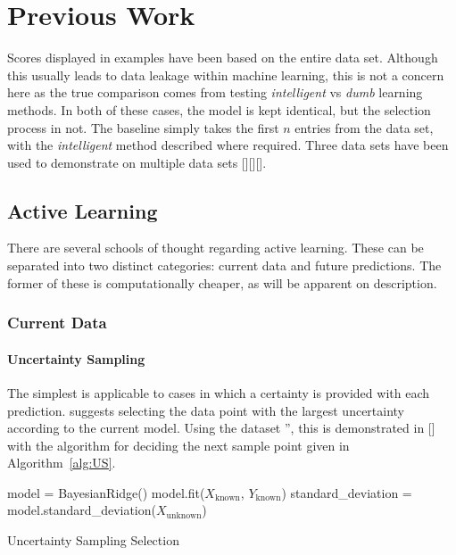 
\chapter{Previous Work}


\graphicspath{{Chapter2/Figs/Vector/}{Chapter2/Figs/}}


Scores displayed in examples have been based on the entire data set. Although this usually leads to data leakage within machine learning, this is not a concern here as the true comparison comes from testing  \textit{intelligent} vs \textit{dumb} learning methods. In both of these cases, the model is kept identical, but the selection process in not. The baseline simply takes the first $n$ entries from the data set, with the \textit{intelligent} method described where required. Three data sets have been used to demonstrate on multiple data sets [][][].

\section{Active Learning}\label{ch:Active Learning}
There are several schools of thought regarding active learning. These can be separated into two distinct categories: current data and future predictions. The former of these is computationally cheaper, as will be apparent on description.

\subsection{Current Data}
\subsubsection{Uncertainty Sampling}\label{sec:Uncertainty Sampling}
The simplest is applicable to cases in which a certainty is provided with each prediction. \textcite{Set09} suggests selecting the data point with the largest uncertainty according to the current model. Using the dataset '', this is demonstrated in [] with the algorithm for deciding the next sample point given in Algorithm~\ref{alg:US}.
\\
\begin{algorithm}[H]
  \label{alg:US}\SetAlgoLined
  model = BayesianRidge()\;
  model.fit($X_\mathrm{known}$, $Y_\mathrm{known}$)\;
  standard\_deviation = model.standard\_deviation($X_\mathrm{unknown}$)\;
  \caption{Uncertainty Sampling Selection}
\end{algorithm}

